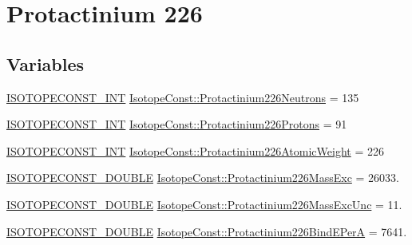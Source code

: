 \hypertarget{group___isotope_const-_protactinium-_pa226}{}\section{Protactinium 226}
\label{group___isotope_const-_protactinium-_pa226}
\subsection*{Variables}
\begin{DoxyCompactItemize}
\item 
\mbox{\hyperlink{group___isotope_const-_macros_ga5f18360b3e99483a35c32d789e62621c}{I\+S\+O\+T\+O\+P\+E\+C\+O\+N\+S\+T\+\_\+\+I\+NT}} \mbox{\hyperlink{group___isotope_const-_protactinium-_pa226_gaaaf31c17f94992b7975cbc33f43d773f}{Isotope\+Const\+::\+Protactinium226\+Neutrons}} = 135
\item 
\mbox{\hyperlink{group___isotope_const-_macros_ga5f18360b3e99483a35c32d789e62621c}{I\+S\+O\+T\+O\+P\+E\+C\+O\+N\+S\+T\+\_\+\+I\+NT}} \mbox{\hyperlink{group___isotope_const-_protactinium-_pa226_gadaef9b7a63d167820a7dc4aa4e70bbe0}{Isotope\+Const\+::\+Protactinium226\+Protons}} = 91
\item 
\mbox{\hyperlink{group___isotope_const-_macros_ga5f18360b3e99483a35c32d789e62621c}{I\+S\+O\+T\+O\+P\+E\+C\+O\+N\+S\+T\+\_\+\+I\+NT}} \mbox{\hyperlink{group___isotope_const-_protactinium-_pa226_ga9a590a7c280c78d8afb1c073b33f8dbb}{Isotope\+Const\+::\+Protactinium226\+Atomic\+Weight}} = 226
\item 
\mbox{\hyperlink{group___isotope_const-_macros_ga8f45a7272ce02c0b4c65c44636ed719a}{I\+S\+O\+T\+O\+P\+E\+C\+O\+N\+S\+T\+\_\+\+D\+O\+U\+B\+LE}} \mbox{\hyperlink{group___isotope_const-_protactinium-_pa226_ga69846d509d0046d7c2878bca7c1f1347}{Isotope\+Const\+::\+Protactinium226\+Mass\+Exc}} = 26033.
\item 
\mbox{\hyperlink{group___isotope_const-_macros_ga8f45a7272ce02c0b4c65c44636ed719a}{I\+S\+O\+T\+O\+P\+E\+C\+O\+N\+S\+T\+\_\+\+D\+O\+U\+B\+LE}} \mbox{\hyperlink{group___isotope_const-_protactinium-_pa226_ga1cd5c186b35633fd6e17ccd24431cd03}{Isotope\+Const\+::\+Protactinium226\+Mass\+Exc\+Unc}} = 11.
\item 
\mbox{\hyperlink{group___isotope_const-_macros_ga8f45a7272ce02c0b4c65c44636ed719a}{I\+S\+O\+T\+O\+P\+E\+C\+O\+N\+S\+T\+\_\+\+D\+O\+U\+B\+LE}} \mbox{\hyperlink{group___isotope_const-_protactinium-_pa226_ga20ccb3a4c87f5cf9b166576f2d52aa5b}{Isotope\+Const\+::\+Protactinium226\+Bind\+E\+PerA}} = 7641.

\end{DoxyCompactItemize}
